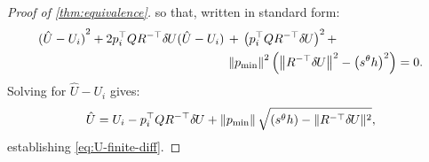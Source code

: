 \documentclass[sisc-eikonal.tex]{subfiles}
\begin{document}
\begin{proof}[Proof of \cref{thm:equivalence}]
  so that, written in standard form:
  \begin{equation}
    \begin{aligned}
      {(\hat{U} - U_i)}^2 + 2 p_i^\top Q R^{-\top} {\delta \hspace{-0.09em} U} {(\hat{U} - U_i)} \,&+\, \left(p_i^\top Q R^{-\top} {\delta \hspace{-0.09em} U}\right)^2 + \\
       &\left\|p_{\operatorname{min}}\right\|^2 \left(\left\|R^{-\top} {\delta \hspace{-0.09em} U}\right\|^2 - \left(s^\theta h\right)^2\right) = 0.
    \end{aligned}
  \end{equation}
  Solving for $\hat{U} - U_i$ gives:
  \begin{equation}
    \hat{U} = U_i - p_i^\top Q R^{-\top} {\delta \hspace{-0.09em} U} + \left\|p_{\operatorname{min}}\right\| \sqrt{\left(s^\theta h\right) - \|R^{-\top} {\delta \hspace{-0.09em} U}\|^2},
  \end{equation}
  establishing \cref{eq:U-finite-diff}.


\end{proof}
\end{document}
